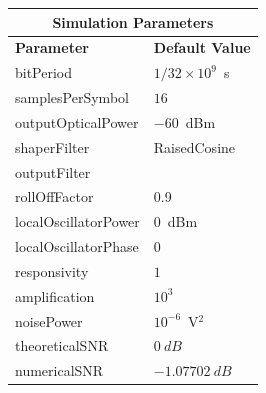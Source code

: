 \begin{refsection}
\begin{table}[H]
	\begin{tabular}{|l|l|}
		\hline
		\multicolumn{2}{|c|}{ \textbf{Simulation Parameters} } \\
		\hline
		\textbf{Parameter}     & \textbf{Default Value}                                     \\\hline
		bitPeriod              & $1/32\times10^9$~s														\\\hline
		samplesPerSymbol       & $16$                                                       \\\hline
		outputOpticalPower     & $-60$~dBm 													\\ \hline
		shaperFilter	       & RaisedCosine												\\ \hline
		outputFilter		   &                											\\ \hline
		rollOffFactor		   & 0.9														\\ \hline
		localOscillatorPower   & $0$~dBm                                                    \\ \hline
		localOscillatorPhase   & $0$                                                        \\ \hline
		responsivity           & $1$                                                        \\ \hline
		amplification          & $10^3$                                                     \\ \hline
		noisePower   & $10^{-6}$~V$^2$                             					\\ \hline
		theoreticalSNR  	   & $0~dB$                             					\\ \hline
		numericalSNR 		     & $-1.07702~dB$                             					\\ \hline

\end{tabular}
\end{table}
\end{refsection}
